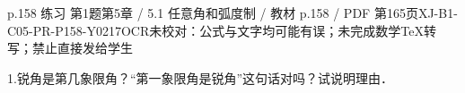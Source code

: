 \begin{bankitem}{p.158 练习 第1题}{第5章 / 5.1 任意角和弧度制 / 教材 p.158 / PDF 第165页}{XJ-B1-C05-PR-P158-Y0217}{OCR未校对：公式与文字均可能有误；未完成数学TeX转写；禁止直接发给学生}
\begin{ocrdraft}
\par
1.锐角是第几象限角？“第一象限角是锐角”这句话对吗？试说明理由．
\end{ocrdraft}
\end{bankitem}
